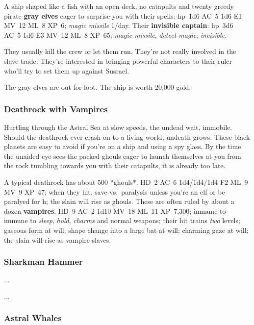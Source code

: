 \documentclass[11pt]{bxart}
\begin{document}
A ship shaped like a fish with an open deck, no catapults and twenty
greedy pirate \textbf{gray elves} eager to surprise you with their
spells: hp~1d6 AC~5 1d6 E1 MV~12 ML~8 XP~6; \emph{magic missile}
1/day. Their \textbf{invisible captain}: hp~3d6 AC~5 1d6 E3 MV~12 ML~8
XP~65; \emph{magic missile}, \emph{detect magic}, \emph{invisible}.

They usually kill the crew or let them run. They're not really
involved in the slave trade. They're interested in bringing powerful
characters to their ruler who'll try to set them up against Susrael.

The gray elves are out for loot. The ship is worth 20,000 gold.

\subsubsection{Deathrock with Vampires}

Hurtling through the Astral Sea at slow speeds, the undead wait,
immobile. Should the deathrock ever crash on to a living world,
undeath grows. These black planets are easy to avoid if you're on a
ship and using a spy glass. By the time the unaided eye sees the
packed ghouls eager to launch themselves at you from the rock tumbling
towards you with their catapults, it is already too late.

A typical deathrock has about 500 *ghouls*. HD~2 AC~6 1d4/1d4/1d4 F2
ML~9 MV~9 XP~47; when they hit, save vs.~paralysis unless you're an
elf or be paralyed for \unit[1]{h}; the slain will rise as ghouls.
These are often ruled by about a dozen \textbf{vampires}. HD~9 AC~2
1d10 MV~18 ML~11 XP~7,300; immune to immune to \textit{sleep},
\textit{hold}, \textit{charms} and normal weapons; their hit trains
\emph{two} levels; gaseous form at will; shape change into a large bat
at will; charming gaze at will; the slain will rise as vampire slaves.

\subsubsection{Sharkman Hammer}

...

\newpage

...

\newpage

\subsubsection{Astral Whales}
\end{document}
